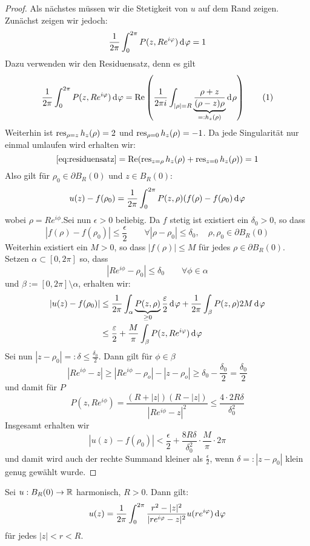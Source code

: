 \begin{proof}
  Als nächstes müssen wir die Stetigkeit von $u$ auf dem Rand
  zeigen. Zunächst zeigen wir jedoch:
  \[
  \frac{1}{2\pi} \int_0^{2\pi} P(z, Re^{i\phi}) \d[\phi] = 1
  \]
  Dazu verwenden wir den Residuensatz, denn es gilt
  \[
  \frac{1}{2\pi} \int_0^{2\pi} P(z, Re^{i\phi}) \d[\phi]
  = \Re \left ( \frac{1}{2\pi i} \int_{|\rho| = R} \underbrace{
      \frac{\rho + z}{(\rho - z)\rho}}_{=:h_z(\rho)} \d[\rho] \right
  ) \label{eq:residuensatz} \tag{1}
  \]
  Weiterhin ist $\operatorname{res}_{\rho = z} h_z(\rho) = 2$ und $\operatorname{res}_{\rho=0}
  h_z(\rho) = -1$. Da jede Singularität nur einmal umlaufen wird
  erhalten wir:
  \[
  \eqref{eq:residuensatz} = \operatorname{Re}(\operatorname{res}_{z = \rho}h_z(\rho) + \operatorname{res}_{z =
    0} h_z(\rho)) = 1
  \]
  Also gilt für $\rho_0 \in \partial B_R(0)$ und $z \in B_R(0)$:
  \[
  u(z) - f(\rho_0) = \frac{1}{2\pi} \int_0^{2\pi} P(z, \rho) (f (\rho)
  - f(\rho_0) \d[\phi]
  \]
  wobei $\rho = Re^{i\phi}$.Sei nun $\epsilon > 0$ beliebig. Da $f$
  stetig ist existiert ein $\delta_0 > 0$, so dass
  \[
  |f(\rho) - f(\rho_0)| \leq \frac{\epsilon}{2} \qquad \forall |\rho -
  \rho_0| \leq \delta_0, \quad \rho, \rho_0 \in \partial B_R(0)
  \]
  Weiterhin existiert ein $M > 0$, so dass $|f(\rho)| \leq M$ für
  jedes $\rho \in \partial B_R(0)$. Setzen $\alpha \subset [0, 2\pi]$
  so, dass
  \[
  |R e^{i\phi} - \rho_0| \leq \delta_0 \qquad \forall \phi \in \alpha
  \]
  und $\beta := [0, 2\pi]\setminus \alpha$, erhalten wir:
  \begin{align*}
    |u(z) - f(\rho_0)| & \leq \frac{1}{2\pi} \int_\alpha
    \underbrace{P(z, \rho)}_{\geq 0} \frac{\epsilon}{2} \d[\phi] +
    \frac{1}{2\pi} \int_\beta P(z, \rho) 2 M \d[\phi] \\
    & \leq \frac{\epsilon}{2} + \frac{M}{\pi} \int_\beta P(z,
    Re^{i\phi}) \d[\phi]
  \end{align*}
  Sei nun $|z - \rho_0| =: \delta \leq \frac{\delta_0}{2}$. Dann gilt
  für $\phi \in \beta$
  \[
  |Re^{i\phi} - z| \geq |Re^{i\phi} - \rho_o| - |z - \rho_o| \geq
  \delta_0 - \frac{\delta_0}{2} = \frac{\delta_0}{2}
  \]
  und damit für $P$
  \[
  P(z, Re^{i\phi}) = \frac{(R+ |z|)(R - |z|)}{|Re^{i\phi} - z|^2} \leq
  \frac{4 \cdot 2 R \delta}{\delta_0^2}
  \]
  Insgesamt erhalten wir
  \[
  |u(z) - f(\rho_0)| < \frac{\epsilon}{2} + \frac{8 R
    \delta}{\delta_0^2} \cdot \frac{M}{\pi} \cdot 2\pi
  \]
  und damit wird auch der rechte Summand kleiner als
  $\frac{\epsilon}{2}$, wenn $\delta =: |z - \rho_0|$ klein genug
  gewählt wurde.
\end{proof}

\begin{cor}
  \label{cor:harm-darstellung}
  Sei $u: B_R(0) \rightarrow \mathbb{R}$ harmonisch, $ R > 0$. Dann gilt:
  \[
  u(z) = \frac{1}{2\pi} \int_0^{2\pi} \frac{r^2 - |z|^2}{|re^{i\phi} -
    z|^2} u(re^{i\phi}) \d[\phi]
  \]
  für jedes $|z|<r<R$.
\end{cor}

